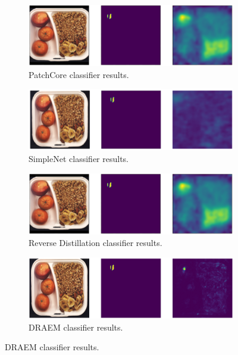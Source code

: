 \begin{figure}[H]
    \captionsetup[subfigure]{justification=centering}
    \centering
    \begin{subfigure}[b]{0.45\textwidth}
        \centering
        \includegraphics[width=\textwidth]{figures/sameimagecomparison/breakfast_box_test_structural_anomalies_059.png}
        \caption{PatchCore \cite{patchCore2022} classifier results.}

    \end{subfigure}
    \begin{subfigure}[b]{0.45\textwidth}
        \centering
        \includegraphics[width=\textwidth]{figures/sameimagecomparison/image_prediction_244.png}
        \caption{SimpleNet \cite{liu2023simplenet} classifier results.}

    \end{subfigure}
    \begin{subfigure}[b]{0.45\textwidth}
        \centering
        \includegraphics[width=\textwidth]{figures/sameimagecomparison/breakfast_box_test_structural_anomalies_059.png}
        \caption{Reverse Distillation \cite{revdist2023} classifier results.}

    \end{subfigure}
    \begin{subfigure}[b]{0.45\textwidth}
        \centering
        \includegraphics[width=\textwidth]{figures/sameimagecomparison/BB_DRAEM.png}
        \caption{DRAEM \cite{Zavrtanik_2021DRAEM} classifier results.}


\end{subfigure}
\end{figure}
